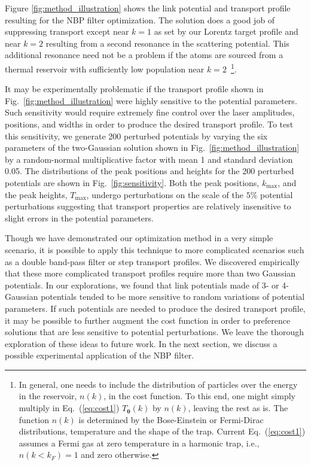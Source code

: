 \documentclass[twocolumn,amsmath,amssymb,showpacs,prl,superscriptaddress,aps]{revtex4-1}
\begin{document}
Figure \ref{fig:method_illustration} shows the link potential and transport profile resulting for the NBP filter optimization. The solution does a good job of suppressing transport except near $k=1$ as set by our Lorentz target profile and near $k=2$ resulting from a second resonance in the scattering potential. This additional resonance need not be a problem if the atoms are sourced from a thermal reservoir with sufficiently low population near $k=2$~\footnote{In general, one needs to include the distribution of particles over the energy in the reservoir, $n(k)$,
in the cost function. To this end, one might simply multiply in Eq.~(\ref{eq:cost1}) $T_{\bm{\theta}}(k)$ by $n(k)$, leaving the rest as is.
The function $n(k)$ is determined by the Bose-Einstein or Fermi-Dirac distributions, temperature and the shape of the trap. Current Eq.~(\ref{eq:cost1}) assumes a Fermi gas 
at zero temperature in a harmonic trap, i.e., $n(k<k_F)=1$ and zero otherwise.}.
 
It may be experimentally problematic if the transport profile shown in Fig.~\ref{fig:method_illustration} were highly sensitive to the potential parameters. Such sensitivity would require extremely fine control over the laser amplitudes, positions, and widths in order to produce the desired transport profile. To test this sensitivity, we generate 200 perturbed potentials by varying the six parameters of the two-Gaussian solution shown in Fig.~\ref{fig:method_illustration} by a random-normal multiplicative factor with mean 1 and standard deviation 0.05. The distributions of the peak positions and heights for the 200 perturbed potentials are shown in Fig.~\ref{fig:sensitivity}. Both the peak positions, $k_{\mathrm{max}}$, and the peak heights, $T_{\mathrm{max}}$, undergo perturbations on the scale of the $5\%$  potential perturbations suggesting that transport properties are relatively insensitive to slight errors in the potential parameters. 

Though we have demonstrated our optimization method in a very simple scenario, it is possible to apply this technique to more complicated scenarios such as a double band-pass filter or step transport profiles.  We discovered empirically that these more complicated transport profiles require more than two Gaussian potentials. In our explorations, we found that link potentials made of 3- or 4-Gaussian potentials tended to be more sensitive to random variations of potential parameters. If such potentials are needed to produce the desired transport profile, it may be possible to further augment the cost function in order to preference solutions that are less sensitive to potential perturbations. We leave the thorough exploration of these ideas to future work. In the next section, we discuss a possible experimental application of the NBP filter.
\end{document}
